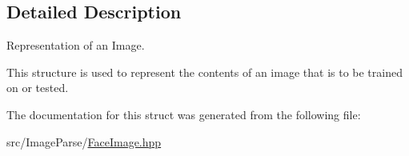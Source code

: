 \subsection{Detailed Description}
Representation of an Image. 

This structure is used to represent the contents of an image that is to be trained on or tested. 

The documentation for this struct was generated from the following file\+:\begin{DoxyCompactItemize}
\item 
src/\+Image\+Parse/\hyperlink{_face_image_8hpp}{Face\+Image.\+hpp}\end{DoxyCompactItemize}
